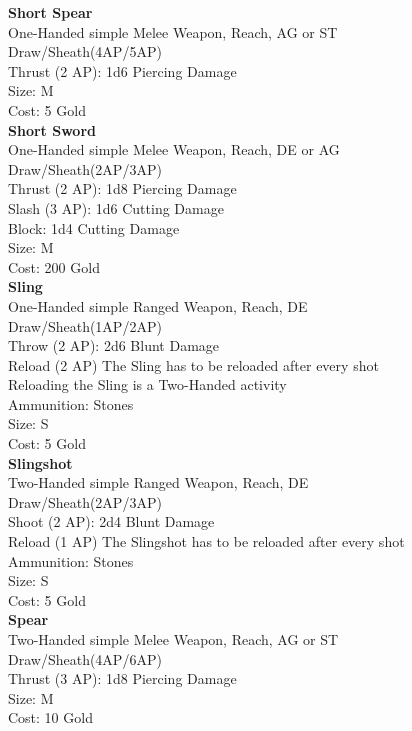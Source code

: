 \textbf{Short Spear}\label{weapon:shortSpear}\\
One-Handed simple Melee Weapon,  Reach, AG or ST\\
Draw/Sheath(4AP/5AP)\\
Thrust (2 AP): 1d6 Piercing Damage\\
Size: M\\
Cost: 5 Gold\\


\textbf{Short Sword}\label{weapon:shortSword}\\
One-Handed simple Melee Weapon,  Reach, DE or AG\\
Draw/Sheath(2AP/3AP)\\
Thrust (2 AP): 1d8 Piercing Damage\\
Slash (3 AP): 1d6 Cutting Damage\\
Block: 1d4 Cutting Damage\\
Size: M\\
Cost: 200 Gold\\


\textbf{Sling}\label{weapon:sling}\\
One-Handed simple Ranged Weapon,  Reach, DE\\
Draw/Sheath(1AP/2AP)\\
Throw (2 AP): 2d6 Blunt Damage\\
Reload (2 AP) The Sling has to be reloaded after every shot\\
Reloading the Sling is a Two-Handed activity\\
Ammunition: Stones\\
Size: S\\
Cost: 5 Gold\\


\textbf{Slingshot}\label{weapon:slingshot}\\
Two-Handed simple Ranged Weapon,  Reach, DE\\
Draw/Sheath(2AP/3AP)\\
Shoot (2 AP): 2d4 Blunt Damage\\
Reload (1 AP) The Slingshot has to be reloaded after every shot\\
Ammunition: Stones\\
Size: S\\
Cost: 5 Gold\\


\textbf{Spear}\label{weapon:spear}\\
Two-Handed simple Melee Weapon,  Reach, AG or ST\\
Draw/Sheath(4AP/6AP)\\
Thrust (3 AP): 1d8 Piercing Damage\\
Size: M\\
Cost: 10 Gold\\


